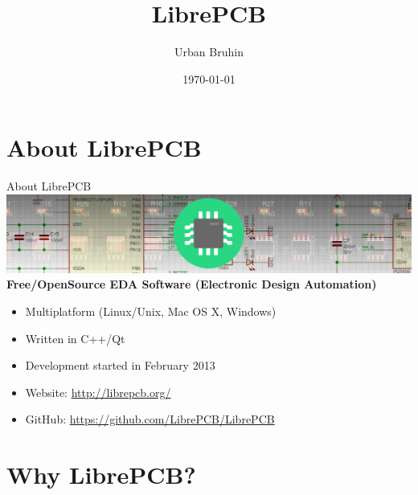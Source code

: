 \documentclass[aspectratio=1610,t]{beamer}
\title{LibrePCB}
\date{\today}
\author{Urban Bruhin}
\institute{Coredump Rapperswil}
\begin{document}
\maketitle





\section{About LibrePCB}

\begin{frame}{About LibrePCB}
  \includegraphics[width=\linewidth]{images/header.png} \linebreak\linebreak
  \textbf{Free/OpenSource EDA Software (Electronic Design Automation)}
  \begin{itemize}
    \item Multiplatform (Linux/Unix, Mac OS X, Windows)
    \item Written in C++/Qt
    \item Development started in February 2013
    \item Website: \url{http://librepcb.org/}
    \item GitHub: \url{https://github.com/LibrePCB/LibrePCB}
  \end{itemize}
\end{frame}


\section{Why LibrePCB?}
\end{document}
